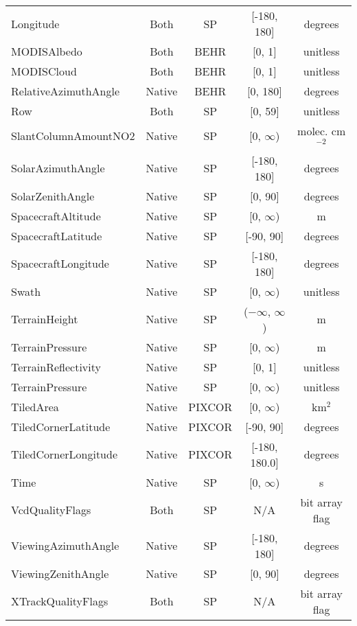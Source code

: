 \documentclass[12pt]{article}
\begin{document}
\begin{center}
\begin{longtable}{lcccc}
	Longitude			& 	Both 		& 	SP			&	[-180, 180] & degrees \\
	MODISAlbedo			&	Both		 	&	BEHR			&	[0, 1]	 & unitless \\
	MODISCloud			&	Both 		&	BEHR			&	[0, 1]	 & unitless \\
	RelativeAzimuthAngle &	Native	 	&	BEHR			&	[0, 180] & degrees \\
	Row					&	Both 		&	SP			&   [0, 59]	& unitless \\
	SlantColumnAmountNO2 & 	Native	 	&	SP			& 	[0, $\infty$) & molec. cm$^{-2}$ \\
	SolarAzimuthAngle	&	Native	 	&	SP			&	[-180, 180] & degrees \\
	SolarZenithAngle		&	Native	 	&	SP			&	[0, 90]		& degrees \\
	SpacecraftAltitude	&	Native		&	SP			&	[0, $\infty$)	& m \\
	SpacecraftLatitude	&	Native		&	SP			&	[-90, 90]	& degrees \\
	SpacecraftLongitude	&	Native		&	SP			&	[-180, 180]	& degrees \\
	Swath				&	Native	 	&	SP			&	[0, $\infty$)	& unitless \\
	TerrainHeight		&	Native	 	& 	SP			&	($-\infty$, $\infty$) 	& m \\
	TerrainPressure		&	Native	 	& 	SP			&	[0, $\infty$) 	& m \\
	TerrainReflectivity	&	Native 		&	SP			&	[0, 1]		& unitless \\
	TerrainPressure		&	Native 		&	SP			&	[0, $\infty$)		& unitless \\
	TiledArea			&	Native		& 	PIXCOR		&	[0, $\infty$) & km$^{2}$ \\
	TiledCornerLatitude	&	Native		&	PIXCOR		&	[-90, 90] & degrees \\
	TiledCornerLongitude &	Native		&	PIXCOR		&	[-180, 180.0] & degrees \\
	Time					&	Native	 	&	SP			&	[0, $\infty$)	& s \\
	VcdQualityFlags		&	Both 		&	SP			&	N/A				& bit array flag \\
	ViewingAzimuthAngle	&	Native	 	&	SP			&	[-180, 180]	& degrees \\
	ViewingZenithAngle	&	Native	 	&	SP			&	[0, 90]		& degrees \\
	XTrackQualityFlags	&	Both 		&	SP			&	N/A				& bit array flag \\
	
	\end{longtable}

	\end{center}
\end{document}
